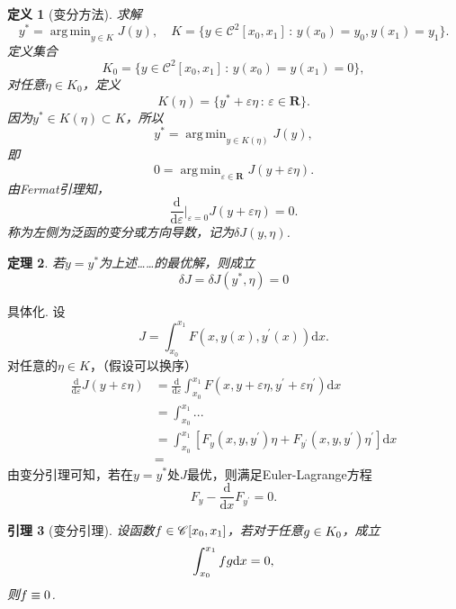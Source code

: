 \documentclass[12pt, a4paper]{article}
\theoremstyle{margin}
\newtheorem{thm}{定理}
\newtheorem{lemma}[thm]{引理}
\newtheorem{defi}[thm]{定义}
\DeclareMathOperator*{\agm}{arg\,min}
\newcommand{\hp}{^\prime}
\newcommand{\ms}{\mathscr}
\newcommand{\f}{\mathnormal{f}}
\newcommand{\g}{\mathnormal{g}}
\newcommand{\R}{\mathbf{R}}
\newcommand{\rd}{\mathrm{d}}
\newcommand{\vep}{\varepsilon}
\newcommand\equref[1]{(\ref{#1})}
\begin{document}
  \begin{defi}[变分方法]
    求解
    \[
      y^* = \agm_{y\in K}J(y),\quad
      K = \{y\in\ms{C}^2[x_0,x_1]\,:\,y(x_0)=y_0, y(x_1)=y_1\}.
    \]
    定义集合
    \[
      K_0 = \{ y\in\ms{C}^2[x_0,x_1]\,:\, y(x_0)=y(x_1)=0 \},
    \]
    对任意$\eta\in K_0$，定义
    \[
      K(\eta) = \{y^* + \vep\eta\,:\, \vep\in\R\}.
    \]
    因为$y^*\in K(\eta)\subset K$，所以
    \[
      y^* = \agm_{y\in K(\eta)} J(y),
    \]
    即
    \[
      0 = \agm_{\vep\in\R} J(y+\vep\eta).
    \]
    由Fermat引理知，
    \[
      \frac{\rd}{\rd \vep} \bigg\vert_{\vep=0} J(y+\vep\eta)=0.
    \]
    称为左侧为泛函的变分或方向导数，记为$\delta J(y,\eta)$.
  \end{defi}

  \begin{thm}
    若$y=y^*$为上述……的最优解，则成立
    \[
      \delta J = \delta J(y^*, \eta) = 0
    \]
  \end{thm}

  具体化. 设
  \[
    J = \int_{x_0}^{x_1} F(x,y(x),y\hp(x)) \rd x.
  \]
  对任意的$\eta \in K$，（假设可以换序）
  \[\begin{split}
    \frac{\rd}{\rd\vep} J(y + \vep\eta) &=
    \frac{\rd}{\rd\vep}\int_{x_0}^{x_1} F(x,y + \vep\eta,y\hp + \vep\eta\hp) \rd x\\
    &= \int_{x_0}^{x_1} ... \\
    &= \int_{x_0}^{x_1} [F_y(x,y,y\hp)\eta + F_{y\hp}(x,y,y\hp)\eta\hp]\rd x \\
    &=
  \end{split}\]
  由变分引理可知，若在$y=y^*$处$J$最优，则满足Euler-Lagrange方程
  \begin{equation}
    \label{equ: e-l}
    F_y - \frac{\rd}{\rd x}F_{y\hp} = 0.
  \end{equation}

  \begin{lemma}[变分引理]
    设函数$\f\in\ms{C}[x_0,x_1]$，若对于任意$\g\in K_0$，成立
    \[
      \int_{x_0}^{x_1} \f\g\rd x = 0,
    \]
    则$\f\equiv 0$.
  \end{lemma}

\end{document}
